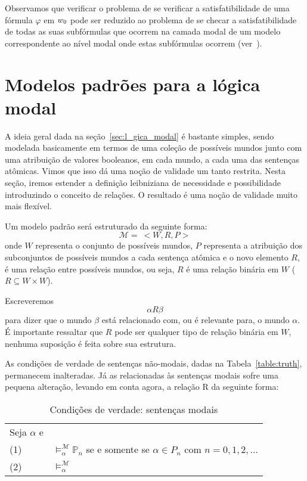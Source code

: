 Observamos que verificar o problema de se verificar a satisfatibilidade de uma fórmula $\varphi$ em $w_0$ pode ser reduzido ao problema de se checar a satisfatibilidade de todas as suas subfórmulas que ocorrem na camada modal de um modelo correspondente ao nível modal onde estas subfórmulas ocorrem (ver~\cite{Areces00tree-basedheuristics}). 

\section{Modelos padrões para a lógica modal}
\label{sec:modelos_padroes}

A ideia geral dada na seção~\ref{sec:l_gica_modal} é bastante simples, sendo
modelada basicamente em termos de uma coleção de possíveis mundos junto com uma
atribuição de valores booleanos, em cada mundo, a cada uma das sentenças
at\^omicas. Vimos que isso dá uma noção de validade um tanto restrita.
Nesta seção, iremos estender a definição leibniziana de necessidade e
possibilidade introduzindo o conceito de relações. O resultado é uma noção de
validade muito mais flexível.

Um modelo padrão será estruturado da seguinte forma:
\begin{equation}
    \label{eq:mod_padrao}
    \mathcal{M} =\ <W,R,P>
\end{equation}
onde $W$ representa o conjunto de possíveis mundos, $P$ representa a atribuição
dos subconjuntos de possíveis mundos a cada sentença at\^omica e o novo elemento
$R$, é uma relação entre possíveis mundos, ou seja, $R$ é uma relação binária em
$W$ ($R \subseteq W \times W$).

Escreveremos
\begin{equation}
    \alpha R \beta
\end{equation}
para dizer que o mundo $\beta$ está relacionado com, ou é relevante para, o
mundo $\alpha$. É importante ressaltar que $R$ pode ser qualquer tipo de relação
binária em $W$, nenhuma suposição é feita sobre sua estrutura.

As condições de verdade de sentenças não-modais, dadas na
Tabela~\ref{table:truth}, permanecem inalteradas. Já as relacionadas às
sentenças modais sofre uma pequena alteração, levando em conta agora, a relação
R da seguinte forma:

    \begin{table}[h!]
\label{table:truth2}
\begin{center}
    \caption{Condições de verdade: sentenças modais}
    \begin{tabular}{ll}
    Seja $\alpha$ e  \\

        \vspace{2mm}
        (1) & $\models ^{\mathcal{M}}_{\alpha} \mathbb{P}_n$ se e somente se $\alpha \in
        P_n$ com $n=0,1,2,\ldots$\\
        (2)  & $\models ^{\mathcal{M}}_{\alpha} $\\

    \end{tabular}
\end{center}
\end{table}

